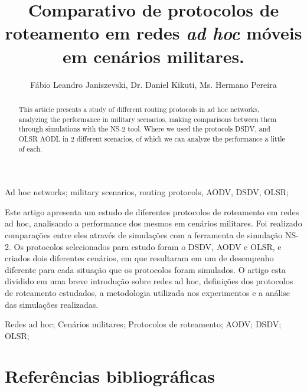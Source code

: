 \documentclass[12pt]{article}
\title{Comparativo de protocolos de roteamento em redes \textit{ad hoc} m\'oveis em cen\'arios militares.}
\author{
	F\'abio Leandro Janiszevski\inst{1}, 
	Dr. Daniel Kikuti\inst{1}, 
	Ms. Hermano Pereira\inst{2}
}
\begin{document}
  \setlength{\leftmargini}{1.70cm}
  \setlength{\labelsep}{.5em}
  \setlength{\parindent}{1.27cm}
  \setlength{\parskip}{0pt}

\maketitle

\begin{abstract}
This article presents a study of different routing protocols in ad hoc networks, analyzing the performance in military scenarios, making comparisons between them through simulations with the NS-2 tool.
Where we used the protocols DSDV, and OLSR AODL in 2 different scenarios, of which we can analyze the performance a little of each.
\end{abstract}

\begin{keyWord}
Ad hoc networks; military scenarios, routing protocols, AODV, DSDV, OLSR;
\end{keyWord}

\begin{resumo}
Este artigo apresenta um estudo de diferentes protocolos de roteamento em redes ad hoc, analisando a performance dos mesmos em cen\'arios militares. 
Foi realizado compara\c{c}\~oes entre eles atrav\'es de simula\c{c}\~oes com a ferramenta de simula\c{c}\~ao NS-2. 
Os protocolos selecionados para estudo foram o DSDV, AODV e OLSR, e criados dois diferentes cen\'arios, em que resultaram em um de desempenho diferente para cada situa\c{c}\~ao que os protocolos foram simulados.
O artigo esta dividido em uma breve introdu\c{c}\~ao sobre redes ad hoc, defini\c{c}\~oes dos protocolos de roteamento estudados, a metodologia utilizada nos experimentos e a an\'alise das simula\c{c}\~oes realizadas.
\end{resumo}

\begin{palavraChave}
Redes ad hoc; Cen\'arios militares; Protocolos de roteamento; AODV; DSDV; OLSR;
\end{palavraChave}


\newpage
\section{Refer\^encias bibliogr\'aficas}
%

\def\bibindent{0.5cm}
\renewcommand{\emph}{\textbf}

\end{document}
